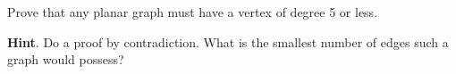 \documentclass{book}
\begin{document}
\setcounter{cpjt}{31}
\addtocounter{cpjt}{-1}
\begin{activity}\label{act-planardeg5}
\hypertarget{p-294}{}%
Prove that any planar graph must have a vertex of degree 5 or less.%
\par\smallskip%
\noindent\textbf{Hint}.\hypertarget{hint-10}{}\quad%
\hypertarget{p-295}{}%
Do a proof by contradiction.  What is the smallest number of edges such a graph would possess?%
\par\smallskip%
\noindent\end{activity}

\clearpage
\end{document}
